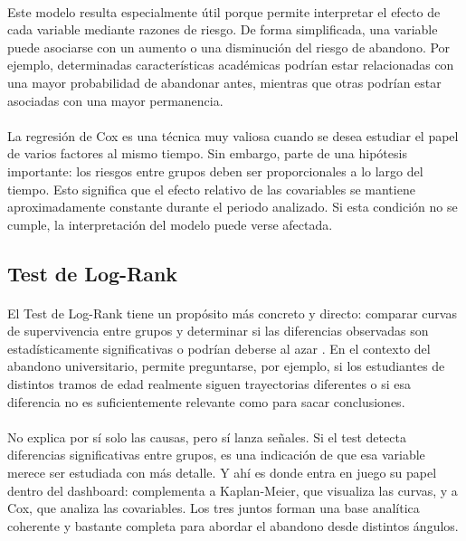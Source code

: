 \paragraph*{}Este modelo resulta especialmente útil porque permite interpretar el efecto de cada variable mediante razones de riesgo. De forma simplificada, una variable puede asociarse con un aumento o una disminución del riesgo de abandono. Por ejemplo, determinadas características académicas podrían estar relacionadas con una mayor probabilidad de abandonar antes, mientras que otras podrían estar asociadas con una mayor permanencia.

\paragraph*{}La regresión de Cox es una técnica muy valiosa cuando se desea estudiar el papel de varios factores al mismo tiempo. Sin embargo, parte de una hipótesis importante: los riesgos entre grupos deben ser proporcionales a lo largo del tiempo. Esto significa que el efecto relativo de las covariables se mantiene aproximadamente constante durante el periodo analizado. Si esta condición no se cumple, la interpretación del modelo puede verse afectada.

\subsection{Test de Log-Rank}
\paragraph*{}El Test de Log-Rank tiene un propósito más concreto y directo: comparar curvas de supervivencia entre grupos y determinar si las diferencias observadas son estadísticamente significativas o podrían deberse al azar \cite{datatab_logrank}. En el contexto del abandono universitario, permite preguntarse, por ejemplo, si los estudiantes de distintos tramos de edad realmente siguen trayectorias diferentes o si esa diferencia no es suficientemente relevante como para sacar conclusiones.

\paragraph*{}No explica por sí solo las causas, pero sí lanza señales. Si el test detecta diferencias significativas entre grupos, es una indicación de que esa variable merece ser estudiada con más detalle. Y ahí es donde entra en juego su papel dentro del dashboard: complementa a Kaplan-Meier, que visualiza las curvas, y a Cox, que analiza las covariables. Los tres juntos forman una base analítica coherente y bastante completa para abordar el abandono desde distintos ángulos.

